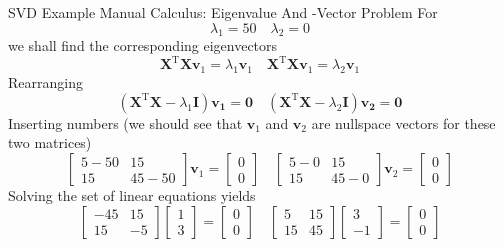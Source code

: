 \documentclass[mathserif, aspectratio=1610]{intbeamer}
\begin{document}
\begin{frame}[t]{SVD Example Manual Calculus: Eigenvalue And -Vector Problem}
For
$$\lambda_1 = 50\quad \lambda_2 = 0$$
we shall find the corresponding eigenvectors
$$\bm{X}^\mathrm{T} \bm{X} \bm{v}_1 = \lambda_1 \bm{v}_1\quad
\bm{X}^\mathrm{T} \bm{X} \bm{v}_1 = \lambda_2 \bm{v}_1$$
Rearranging
$$
(\bm{X}^\mathrm{T} \bm{X} - \lambda_1 \bm{I} )\bm{v_1} = \bm{0}\quad
(\bm{X}^\mathrm{T} \bm{X} - \lambda_2 \bm{I} )\bm{v_2} = \bm{0}
$$
Inserting numbers (we should see that $\bm{v}_1$ and $\bm{v}_2$ are nullspace vectors for these two matrices)
$$
\begin{bmatrix}
5-50 & 15\\
15 & 45-50
\end{bmatrix}
\bm{v}_1
=
\begin{bmatrix}
0 \\0
\end{bmatrix}\quad
\begin{bmatrix}
5-0 & 15\\
15 & 45-0
\end{bmatrix}
\bm{v}_2
=
\begin{bmatrix}
0 \\0
\end{bmatrix}
$$
Solving the set of linear equations yields
$$
\begin{bmatrix}
-45 & 15\\
15 & -5
\end{bmatrix}
\begin{bmatrix}
1 \\3
\end{bmatrix}
=
\begin{bmatrix}
0 \\0
\end{bmatrix}\quad
\begin{bmatrix}
5 & 15\\
15 & 45
\end{bmatrix}
\begin{bmatrix}
3 \\-1
\end{bmatrix}
=
\begin{bmatrix}
0 \\0
\end{bmatrix}
$$
\end{frame}
\end{document}
